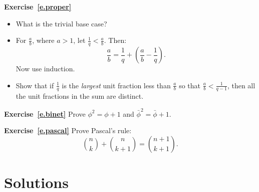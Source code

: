 \documentclass[11pt,a4paper]{report}
\begin{document}
\medskip

\textbf{Exercise~\ref{e.proper}}
\begin{itemize}
\item What is the trivial base case?
\item For $\frac{a}{b}$, where $a>1$, let $\frac{1}{q} < \frac{a}{b}$. Then:
\[
\frac{a}{b} = \frac{1}{q} + \left( \frac{a}{b} - \frac{1}{q} \right).
\]
Now use induction.
\item Show that if $\frac{1}{q}$ is the \emph{largest} unit fraction less than $\frac{a}{b}$ so that $\frac{a}{b} < \frac{1}{q-1}$, then all the unit fractions in the sum are distinct.
\end{itemize}

\medskip

\textbf{Exercise~\ref{e.binet}} Prove $\phi^2=\phi+1$ and $\bar{\phi}^2=\bar{\phi}+1$.

\medskip

\textbf{Exercise~\ref{e.pascal}}
Prove Pascal's rule:
\[
{n \choose k} + {n \choose k+1} = {n+1 \choose k+1}.
\]


\chapter{Solutions}\label{a.solutions}

\setlength{\jot}{6pt}
\end{document}
